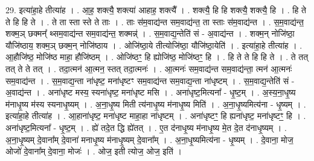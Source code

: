 \documentclass[17pt]{extarticle}
\begin{document}
29. इत्या॑हा॒हे तीत्या॑ह । . आ॒ह॒ शक्त्यै॒ शक्त्या॑ आहाह॒ शक्त्यै᳚ । . शक्त्यै॒ हि हि शक्त्यै॒ शक्त्यै॒ हि । . हि ते ते हि हि ते । . ते ता स्ता स्ते ते ताः । . ताः स॑म॒वाद्य॑न्त सम॒वाद्य॑न्त॒ ता स्ताः स॑म॒वाद्य॑न्त । . स॒म॒वाद्य॑न्त॒ शक्म॒ञ् छक्मन्᳚ थ्सम॒वाद्य॑न्त सम॒वाद्य॑न्त॒ शक्मन्न्॑ । . स॒म॒वाद्य॒न्तेति॑ सं - अ॒वाद्य॑न्त । . शक्म॒न् नोजि॑ष्ठा॒ यौजि॑ष्ठाय॒ शक्म॒ञ् छक्म॒न् नोजि॑ष्ठाय । . ओजि॑ष्ठा॒ये तीत्योजि॑ष्ठा॒ यौजि॑ष्ठा॒येति॑ । . इत्या॑हा॒हे तीत्या॑ह । . आ॒हौजि॑ष्ठ॒ मोजि॑ष्ठ माहा॒ हौजि॑ष्ठम् । . ओजि॑ष्ठꣳ॒॒ हि ह्योजि॑ष्ठ॒ मोजि॑ष्ठꣳ॒॒ हि । . हि ते ते हि हि ते । . ते तत् तत् ते ते तत् । . तदा॒त्मन॑ आ॒त्मन॒ स्तत् तदा॒त्मनः॑ । . आ॒त्मनः॑ सम॒वाद्य॑न्त सम॒वाद्य॑न्ता॒ त्मन॑ आ॒त्मनः॑ सम॒वाद्य॑न्त । . स॒म॒वाद्य॒न्ता ना॑धृष्ट॒ मना॑धृष्टꣳ सम॒वाद्य॑न्त सम॒वाद्य॒न्ता ना॑धृष्टम् । . स॒म॒वाद्य॒न्तेति॑ सं - अ॒वाद्य॑न्त । . अना॑धृष्ट मस्य॒ स्यना॑धृष्ट॒ मना॑धृष्ट मसि । . अना॑धृष्ट॒मित्यना᳚ - धृ॒ष्ट॒म् । . अ॒स्य॒ना॒धृ॒ष्य म॑नाधृ॒ष्य म॑स्य स्यनाधृ॒ष्यम् । . अ॒ना॒धृ॒ष्य मिती त्य॑नाधृ॒ष्य म॑नाधृ॒ष्य मिति॑ । . अ॒ना॒धृ॒ष्यमित्य॑ना - धृ॒ष्यम् । . इत्या॑हा॒हे तीत्या॑ह । . आ॒हाना॑धृष्ट॒ मना॑धृष्ट माहा॒हा ना॑धृष्टम् । . अना॑धृष्टꣳ॒॒ हि ह्यना॑धृष्ट॒ मना॑धृष्टꣳ॒॒ हि । . अना॑धृष्ट॒मित्यना᳚ - धृ॒ष्ट॒म् । . ह्ये॑ तदे॒त द्धि ह्ये॑तत् । . ए॒त द॑नाधृ॒ष्य म॑नाधृ॒ष्य मे॒त दे॒त द॑नाधृ॒ष्यम् । . अ॒ना॒धृ॒ष्यम् दे॒वाना᳚म् दे॒वाना॑ मनाधृ॒ष्य म॑नाधृ॒ष्यम् दे॒वाना᳚म् । . अ॒ना॒धृ॒ष्यमित्य॑ना - धृ॒ष्यम् । . दे॒वाना॒ मोज॒ ओजो॑ दे॒वाना᳚म् दे॒वाना॒ मोजः॑ । . ओज॒ इती त्योज॒ ओज॒ इति॑ । \newline
\end{document}
